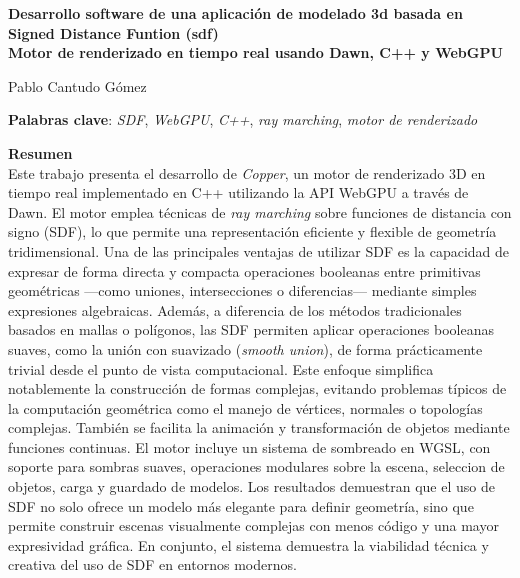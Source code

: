 \thispagestyle{empty}

\begin{center}
{\large\bfseries Desarrollo software de una aplicación de modelado 3d basada en Signed Distance Funtion (sdf) \\ Motor de renderizado en tiempo real usando Dawn, C++ y WebGPU }\\
\end{center}
\begin{center}
Pablo Cantudo Gómez\\
\end{center}

\vspace{0.7cm}

\vspace{0.5cm}
\noindent\textbf{Palabras clave}: \textit{SDF}, \textit{WebGPU}, \textit{C++}, \textit{ray marching}, \textit{motor de renderizado}
\vspace{0.7cm}

\noindent\textbf{Resumen}\\
\break
Este trabajo presenta el desarrollo de \textit{Copper}, un motor de renderizado 3D en tiempo real implementado en C++ utilizando la API WebGPU a trav\'es de Dawn.
El motor emplea t\'ecnicas de \textit{ray marching} sobre funciones de distancia con signo (SDF), lo que permite una representaci\'on eficiente y flexible de geometr\'ia 
 tridimensional. Una de las principales ventajas de utilizar SDF es la capacidad de expresar de forma directa y compacta operaciones booleanas entre primitivas geom\'etricas
  ---como uniones, intersecciones o diferencias--- mediante simples expresiones algebraicas. Adem\'as, a diferencia de los m\'etodos tradicionales basados en mallas o 
  pol\'igonos, las SDF permiten aplicar operaciones booleanas suaves, como la uni\'on con suavizado (\textit{smooth union}), 
  de forma pr\'acticamente trivial desde el punto de vista computacional.
\bigbreak
Este enfoque simplifica notablemente la construcci\'on de formas complejas, evitando problemas t\'ipicos de la computaci\'on geom\'etrica como el manejo 
de v\'ertices, normales o topolog\'ias complejas. Tambi\'en se facilita la animaci\'on y transformaci\'on de objetos mediante funciones continuas. El motor 
incluye un sistema de sombreado en WGSL, con soporte para sombras suaves, operaciones modulares sobre la escena, seleccion de objetos, carga y guardado de modelos. Los resultados demuestran que
el uso de SDF no solo ofrece un modelo m\'as elegante para definir geometr\'ia, sino que permite construir escenas visualmente complejas con menos c\'odigo y una mayor expresividad gr\'afica.
En conjunto, el sistema demuestra la viabilidad t\'ecnica y creativa del uso de SDF en entornos modernos.
\cleardoublepage

